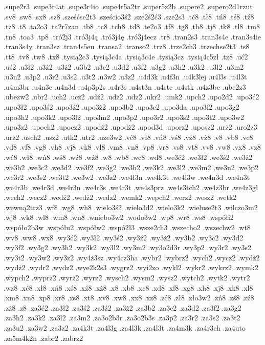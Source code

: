 {.supe2r3
.supe3r4at
.supe3r4io
.supe4r5a2tr
.super5z2b
.supere2
.supero2d1rzut
.sv8
.sw8
.sx8
.sz8
.sześćse2t3
.sześcio3ś2
.sze2ś2ć3
.sze2s3
.tć8
.tł8
.tń8
.tś8
.tź8
.tż8
.t8
.ta2o3
.ta2r7zan
.tb8
.tc8
.tch8
.td8
.te2o3
.tf8
.tg8
.th8
.tj8
.tk8
.tl8
.tm8
.tn8
.toa3
.tp8
.tró2j3
.tró3j4ą
.tró3j4ę
.tró3j4ecz
.tr8
.tran2s3
.tran3s4e
.tran3s4ie
.tran3s4y
.tran3sz
.tran4s5eu
.transa2
.transo2
.trz8
.trze2ch3
.trzechse2t3
.ts8
.tt8
.tv8
.tw8
.tx8
.tysią2c3
.tysią3c4a
.tysią3c4e
.tysią3cz
.tysią4c5zł
.tz8
.uć2
.uś2
.u3ł2
.u3ź2
.u3ż2
.u3b2
.u3c2
.u3d2
.u3f2
.u3g2
.u3h2
.u3k2
.u3l2
.u3m2
.u3n2
.u3p2
.u3r2
.u3s2
.u3t2
.u3w2
.u3z2
.u4d3k
.u4f3n
.u4k3lej
.u4l3s
.u4l3t
.u4m3br
.u4n3c
.u4n3d
.u4p3p2s
.u4r3s
.u4st3n
.u4stc
.u4stk
.u4z3be
.ube2z3
.ubezw2
.ubr2
.uch2
.ucz2
.udź2
.udż2
.udz2
.ukr2
.umk2
.upch2
.upo2d2
.upo3ć2
.upo3ł2
.upo3ś2
.upo3ź2
.upo3ż2
.upo3b2
.upo3c2
.upo3da
.upo3f2
.upo3g2
.upo3h2
.upo3k2
.upo3l2
.upo3m2
.upo3p2
.upo3r2
.upo3s2
.upo3t2
.upo3w2
.upo3z2
.upoch2
.upocz2
.upodź2
.upodż2
.upod3d
.uporz2
.uposz2
.urż2
.uro2z3
.urz2
.usch2
.usz2
.utk2
.utr2
.uze3w2
.vć8
.vł8
.vń8
.vś8
.vź8
.vż8
.v8
.vb8
.vc8
.vd8
.vf8
.vg8
.vh8
.vj8
.vk8
.vl8
.vm8
.vn8
.vp8
.vr8
.vs8
.vt8
.vv8
.vw8
.vx8
.vz8
.wć8
.wł8
.wń8
.wś8
.wź8
.wż8
.w8
.wb8
.wc8
.wd8
.we3ć2
.we3ł2
.we3ś2
.we3ż2
.we3b2
.we3c2
.we3d2
.we3f2
.we3g2
.we3h2
.we3k2
.we3l2
.we3m2
.we3n2
.we3p2
.we3r2
.we3s2
.we3t2
.we3w2
.we3z2
.we4ł3n
.we4k3t
.we4l3w
.we4n3d
.we4n3t
.we4r3b
.we4r3d
.we4r3n
.we4r3s
.we4r3t
.we4s3prz
.we4s3tch2
.we4z3br
.we4z3gł
.wech2
.wecz2
.wedź2
.wedż2
.wedz2
.wemk2
.wepch2
.werz2
.wesz2
.wetk2
.wewną2trz3
.wf8
.wg8
.wh8
.wielo3ś2
.wielo3d2
.wielo3k2
.wieluse2t3
.wilczo3m2
.wj8
.wk8
.wl8
.wm8
.wn8
.wniebo3w2
.wodo3w2
.wp8
.wr8
.ws8
.współi2
.współo2b3w
.współu2
.współw2
.wspó2ł3
.wsze2ch3
.wszecho2
.wszechw2
.wt8
.wv8
.ww8
.wx8
.wy3ć2
.wy3ł2
.wy3ś2
.wy3ź2
.wy3ż2
.wy3b2
.wy3c2
.wy3d2
.wy3f2
.wy3g2
.wy3h2
.wy3k2
.wy3l2
.wy3m2
.wy3o2d3r
.wy3p2
.wy3r2
.wy3s2
.wy3t2
.wy3w2
.wy3z2
.wy4ż3sz
.wy4cz3ha
.wybr2
.wybrz2
.wych2
.wycz2
.wydź2
.wydż2
.wydr2
.wydz2
.wye2k2s3
.wygrz2
.wyi2zo
.wykl2
.wykr2
.wykrz2
.wymk2
.wypch2
.wyprz2
.wyrż2
.wyrz2
.wysch2
.wysm2
.wysz2
.wytch2
.wytk2
.wytr2
.wz8
.xć8
.xł8
.xń8
.xś8
.xź8
.xż8
.x8
.xb8
.xc8
.xd8
.xf8
.xg8
.xh8
.xj8
.xk8
.xl8
.xm8
.xn8
.xp8
.xr8
.xs8
.xt8
.xv8
.xw8
.xx8
.xz8
.zć8
.zł8
.zło3w2
.zń8
.zś8
.zź8
.zż8
.z8
.za3ć2
.za3ł2
.za3ś2
.za3ź2
.za3ż2
.za3b2
.za3c2
.za3d2
.za3f2
.za3g2
.za3h2
.za3k2
.za3l2
.za3m2
.za3o2b3r
.za3o2b3s
.za3p2
.za3r2
.za3s2
.za3t2
.za3u2
.za3w2
.za3z2
.za4k3t
.za4l3g
.za4l3k
.za4l3t
.za4m3k
.za4r3ch
.za4uto
.za5m4k2n
.zabr2
.zabrz2
}
